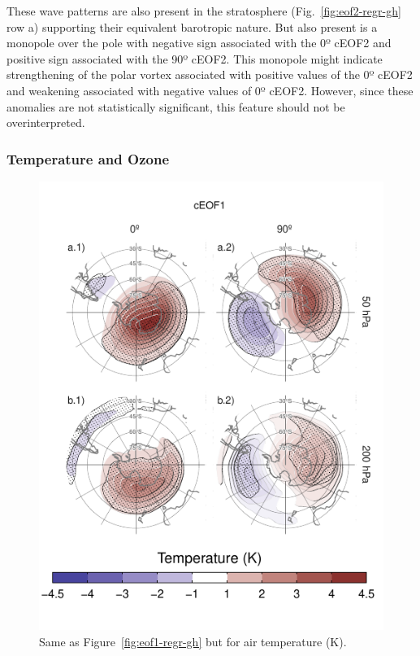 \documentclass[pdflatex,sn-basic]{sn-jnl}
\theoremstyle{thmstyleone}%
\theoremstyle{thmstyletwo}%
\theoremstyle{thmstylethree}%
\begin{document}
These wave patterns are also present in the stratosphere (Fig.~\ref{fig:eof2-regr-gh} row a) supporting their equivalent barotropic nature.
But also present is a monopole over the pole with negative sign associated with the 0º cEOF2 and positive sign associated with the 90º cEOF2.
This monopole might indicate strengthening of the polar vortex associated with positive values of the 0º cEOF2 and weakening associated with negative values of 0º cEOF2.
However, since these anomalies are not statistically significant, this feature should not be overinterpreted.

\hypertarget{temp-ozone}{%
\subsubsection{Temperature and Ozone}\label{temp-ozone}}



\begin{figure}
\centering
\includegraphics{../figures/eof1-regr-t-1.pdf}
\caption{\label{fig:eof1-regr-t}Same as Figure~\ref{fig:eof1-regr-gh} but for air temperature (K).}
\end{figure}
\end{document}
